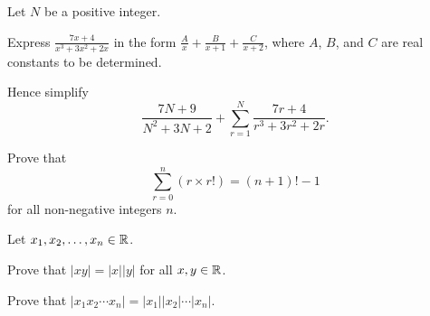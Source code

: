 \begin{problem}
    Let $N$ be a positive integer.
    \begin{partquestions}{\roman*}
        \item Express $\frac{7x+4}{x^3+3x^2+2x}$ in the form $\frac{A}{x} + \frac{B}{x+1} + \frac{C}{x+2}$, where $A$, $B$, and $C$ are real constants to be determined.
        \item Hence simplify
        \[
            \frac{7N+9}{N^2+3N+2} + \sum_{r=1}^N \frac{7r+4}{r^3+3r^2+2r}.
        \]
    \end{partquestions}
\end{problem}

\begin{problem}
    Prove that
    \[
        \sum_{r=0}^n (r\times r!) = (n+1)! - 1
    \]
    for all non-negative integers $n$.
\end{problem}

\begin{problem}\label{problem-absolute-value-is-multiplicative-map}
    Let $x_1, x_2, \dots, x_n \in \mathbb{R}$.
    \begin{partquestions}{\roman*}
        \item Prove that $|xy| = |x||y|$ for all $x, y \in \mathbb{R}$.
        \item Prove that $|x_1x_2\cdots x_n| = |x_1||x_2|\cdots|x_n|$.
    \end{partquestions}
\end{problem}
